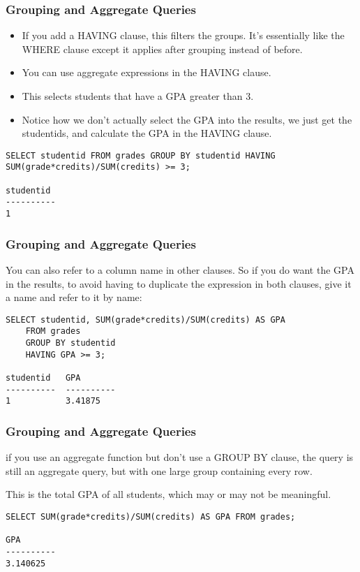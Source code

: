 \begin{frame}[fragile] \frametitle{Grouping and Aggregate Queries}
\begin{itemize}
\item If you add a HAVING clause, this filters the groups. It's essentially like the WHERE clause except it applies after grouping instead of before. 
\item You can use aggregate expressions in the HAVING clause.
\item This selects students that have a GPA greater than 3. 
\item Notice how we don't actually select the GPA into the results, we just get the studentids, and calculate the GPA in the HAVING clause.
\end{itemize}
\begin{lstlisting}
SELECT studentid FROM grades GROUP BY studentid HAVING SUM(grade*credits)/SUM(credits) >= 3;

studentid 
----------
1     
\end{lstlisting}
\end{frame}

\begin{frame}[fragile] \frametitle{Grouping and Aggregate Queries}
You can also refer to a column name in other clauses. So if you do want the GPA in the results, to avoid having to duplicate the expression in both clauses, give it a name and refer to it by name:
\begin{lstlisting}
SELECT studentid, SUM(grade*credits)/SUM(credits) AS GPA 
    FROM grades
    GROUP BY studentid
    HAVING GPA >= 3;

studentid   GPA       
----------  ----------
1           3.41875   
\end{lstlisting}
\end{frame}

\begin{frame}[fragile] \frametitle{Grouping and Aggregate Queries}
 if you use an aggregate function but don't use a GROUP BY clause, the query is still an aggregate query, but with one large group containing every row.

This is the total GPA of all students, which may or may not be meaningful.
\begin{lstlisting}
SELECT SUM(grade*credits)/SUM(credits) AS GPA FROM grades; 

GPA       
----------
3.140625  
\end{lstlisting}
\end{frame}

